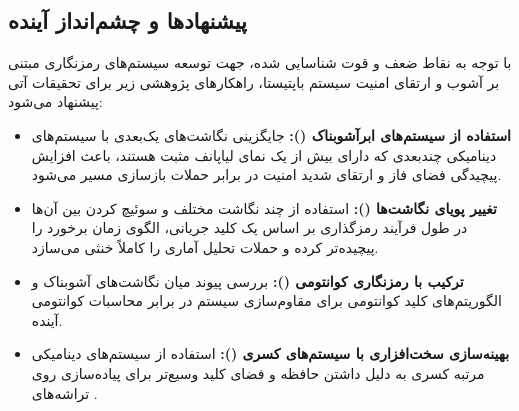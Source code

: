 \documentclass[12pt]{report}
\begin{document}
\newpage

\subsection{پیشنهادها و چشم‌انداز آینده}
با توجه به نقاط ضعف و قوت شناسایی شده، جهت توسعه سیستم‌های رمزنگاری مبتنی بر آشوب و ارتقای امنیت سیستم 
باپتیستا، راهکارهای پژوهشی زیر برای تحقیقات آتی پیشنهاد می‌شود:

\begin{itemize}
    \item \textbf{استفاده از سیستم‌های ابرآشوبناک ():} جایگزینی نگاشت‌های یک‌بعدی 
    با سیستم‌های دینامیکی چندبعدی که دارای بیش از یک نمای لیاپانف مثبت هستند، باعث افزایش پیچیدگی فضای فاز 
    و ارتقای شدید امنیت در برابر حملات بازسازی مسیر می‌شود.
    
    \item \textbf{تغییر پویای نگاشت‌ها ():} استفاده از چند نگاشت مختلف و سوئیچ 
    کردن بین آن‌ها در طول فرآیند رمزگذاری بر اساس یک کلید جریانی، الگوی زمان برخورد را پیچیده‌تر کرده و 
    حملات تحلیل آماری را کاملاً خنثی می‌سازد.
    
    \item \textbf{ترکیب با رمزنگاری کوانتومی ():} بررسی پیوند میان نگاشت‌های 
    آشوبناک و الگوریتم‌های کلید کوانتومی برای مقاوم‌سازی سیستم در برابر محاسبات کوانتومی آینده.
    
    \item \textbf{بهینه‌سازی سخت‌افزاری با سیستم‌های کسری ():} استفاده از 
    سیستم‌های دینامیکی مرتبه کسری به دلیل داشتن حافظه و فضای کلید وسیع‌تر برای پیاده‌سازی روی تراشه‌های 
    .
\end{itemize}


\glsaddall

\printglossary[type=en-fa]
\printglossary[type=fa-en]

\newpage

{}
\nocite{*}
\begin{latin}
    \printbibliography
\end{latin}

\newpage

\appendix
\end{document}
